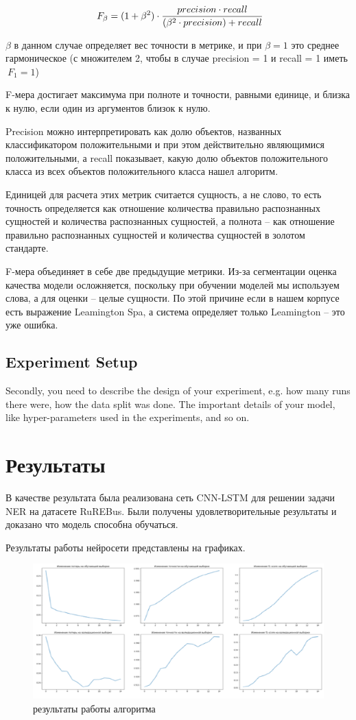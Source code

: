 \documentclass{article}
\begin{document}
$$\large \ F_\beta = (1 + \beta^2) \cdot \frac{precision \cdot recall}{(\beta^2 \cdot precision) + recall}$$


$\beta$ в данном случае определяет вес точности в метрике, и при $\beta = 1$ это среднее гармоническое (с множителем 2, чтобы в случае precision = 1 и recall = 1 иметь $\ F_1 = 1$)

F-мера достигает максимума при полноте и точности, равными единице, и близка к нулю, если один из аргументов близок к нулю.

Precision можно интерпретировать как долю объектов, названных классификатором положительными и при этом действительно являющимися положительными, а recall показывает, какую долю объектов положительного класса из всех объектов положительного класса нашел алгоритм.

Единицей для расчета этих метрик считается сущность, а не слово, то есть точность определяется как отношение количества правильно распознанных сущностей и количества распознанных сущностей, а полнота – как отношение правильно распознанных сущностей и количества сущностей в золотом стандарте. 

F-мера объединяет в себе две предыдущие метрики.
Из-за сегментации оценка качества модели осложняется, поскольку при обучении моделей мы используем слова, а для оценки – целые сущности. По этой причине если в нашем корпусе есть выражение Leamington Spa, а система определяет только Leamington – это уже ошибка.


\subsection{Experiment Setup}
Secondly, you need to describe the design of your experiment, e.g. how many runs there were, how the data split was done. The important details of your model, like hyper-parameters used in the experiments, and so on.


\section{Результаты}
В качестве результата была реализована сеть CNN-LSTM для решении задачи NER на датасете RuREBus. Были получены удовлетворительные результаты и доказано что модель способна обучаться.

Результаты работы нейросети представлены на графиках.

\begin{figure}[!tbh]
    \centering
    \includegraphics[width=0.9\linewidth]{4.png}
    \caption{результаты работы алгоритма}
    \label{fig:circle}
\end{figure}
\end{document}
